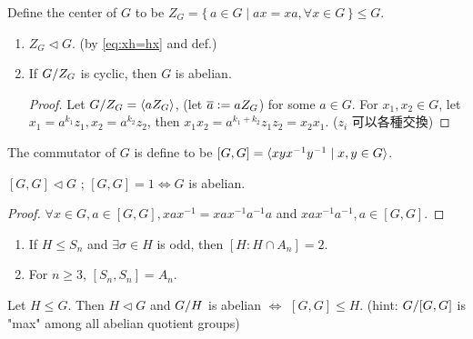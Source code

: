 \begin{definition}
  Define the center of $G$ to be $Z_G = \{\, a \in G
  \mid ax = xa, \forall x \in G \,\} \le G$.
\end{definition}

\begin{prop} \mbox{}
  \begin{enumerate}
    \item $Z_G \lhd G$. (by \ref{eq:xh=hx} and def.)
    \item If ${G}/{Z_G}$ is cyclic, then $G$ is abelian.
      \begin{proof}
        Let ${G}/{Z_G} = \langle aZ_G\rangle$, (let $\overline{a} \vcentcolon= aZ_G$) for some
        $a \in G$.
        For $x_1, x_2 \in G$, let $x_1 = a^{k_1}z_1, x_2 = a^{k_2}z_2$, then
        $x_1x_2 = a^{k_1+k_2}z_1z_2 = x_2x_1$. ($z_i$ 可以各種交換)
      \end{proof}
  \end{enumerate}
\end{prop}

\begin{definition}
  The commutator of $G$ is define to be $[G,G] = \langle xyx^{-1}y^{-1} \mid
  x,y \in G\rangle$.
\end{definition}

\begin{prop}
  $[G,G] \lhd G$ ; $[G,G] = 1 \iff G$ is abelian.
  \begin{proof}
    $\forall x \in G, a \in [G,G], xax^{-1} = xax^{-1}a^{-1}a$ and
    $xax^{-1}a^{-1}, a \in [G,G]$.
  \end{proof}
\end{prop}

\begin{exercise} \mbox{}
  \begin{enumerate}
    \item If $H \le S_n$ and $\exists \sigma \in H$ is odd, then $[H:H\cap A_n] = 2$.
    \item For $n \ge 3$, $[S_n, S_n] = A_n$.
  \end{enumerate}
\end{exercise}

\begin{exercise}
  Let $H \le G$. Then  $H \lhd G$ and ${G}/{H}$ is abelian $\iff$
  $[G,G] \le H$.
  (hint: ${G}/{[G,G]}$ is "max" among all abelian quotient groups)
\end{exercise}


